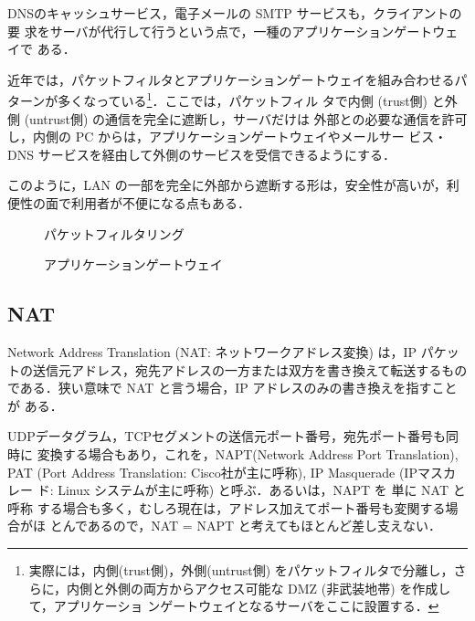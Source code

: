 DNSのキャッシュサービス，電子メールの SMTP サービスも，クライアントの要
求をサーバが代行して行うという点で，一種のアプリケーションゲートウェイで
ある．

近年では，パケットフィルタとアプリケーションゲートウェイを組み合わせるパ
ターンが多くなっている\footnote{実際には，内側(trust側)，外側(untrust側)
をパケットフィルタで分離し，さらに，内側と外側の両方からアクセス可能な
DMZ (非武装地帯) を作成して，アプリケーショ
ンゲートウェイとなるサーバをここに設置する．}．ここでは，パケットフィル
タで内側 (trust側) と外側 (untrust側) の通信を完全に遮断し，サーバだけは
外部との必要な通信を許可し，内側の PC からは，アプリケーションゲートウェイやメールサー
ビス・DNS サービスを経由して外側のサービスを受信できるようにする．

このように，LAN の一部を完全に外部から遮断する形は，安全性が高いが，利便性の面で利用者が不便になる点もある．

\begin{figure}[h]
 \begin{center}
  \caption{パケットフィルタリング}
  \label{fig:06:pf}
 \end{center}
\end{figure}

\begin{figure}[h]
  \begin{center}
  \caption{アプリケーションゲートウェイ}
  \label{fig:06:ag}
 \end{center}
\end{figure}

\subsection{NAT}

Network Address Translation (NAT: ネットワークアドレス変換) は，IP パケッ
トの送信元アドレス，宛先アドレスの一方または双方を書き換えて転送するもの
である．狭い意味で NAT と言う場合，IP アドレスのみの書き換えを指すことが
ある．

UDPデータグラム，TCPセグメントの送信元ポート番号，宛先ポート番号も同時に
変換する場合もあり，これを，NAPT(Network Address Port Translation), PAT
(Port Address Translation: Cisco社が主に呼称), IP Masquerade (IPマスカレー
ド: Linux システムが主に呼称) と呼ぶ．あるいは，NAPT を 単に NAT と呼称
する場合も多く，むしろ現在は，アドレス加えてポート番号も変関する場合がほ
とんであるので，NAT = NAPT と考えてもほとんど差し支えない．

